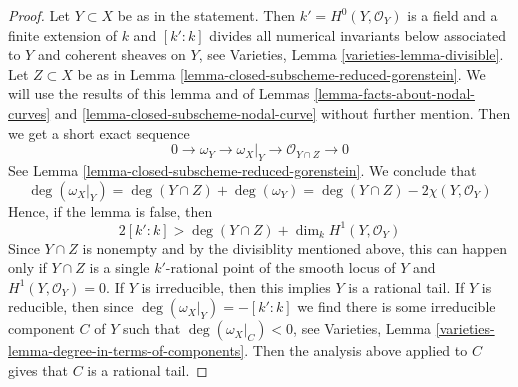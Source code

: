 \documentclass[10pt,a4paper]{amsart}
\theoremstyle{plain}
\theoremstyle{definition}
\theoremstyle{remark}
\numberwithin{equation}{subsection}
\begin{document}
\begin{proof}
Let $Y \subset X$ be as in the statement. Then $k' = H^0(Y, \mathcal{O}_Y)$
is a field and a finite extension of $k$ and $[k' : k]$
divides all numerical invariants below associated to $Y$ and
coherent sheaves on $Y$, see
Varieties, Lemma \ref{varieties-lemma-divisible}.
Let $Z \subset X$ be as in
Lemma \ref{lemma-closed-subscheme-reduced-gorenstein}.
We will use the results of this lemma and of
Lemmas \ref{lemma-facts-about-nodal-curves} and
\ref{lemma-closed-subscheme-nodal-curve} without further mention.
Then we get a short exact sequence
$$
0 \to \omega_Y \to \omega_X|_Y \to \mathcal{O}_{Y \cap Z} \to 0
$$
See Lemma \ref{lemma-closed-subscheme-reduced-gorenstein}.
We conclude that
$$
\deg(\omega_X|_Y) = \deg(Y \cap Z) + \deg(\omega_Y) =
\deg(Y \cap Z) - 2\chi(Y, \mathcal{O}_Y)
$$
Hence, if the lemma is false, then
$$
2[k' : k] > \deg(Y \cap Z) + \dim_k H^1(Y, \mathcal{O}_Y)
$$
Since $Y \cap Z$ is nonempty and by the divisiblity mentioned above,
this can happen only if $Y \cap Z$ is a single $k'$-rational point
of the smooth locus of $Y$ and $H^1(Y, \mathcal{O}_Y) = 0$.
If $Y$ is irreducible, then this implies $Y$ is a rational tail.
If $Y$ is reducible, then since $\deg(\omega_X|_Y) = -[k' : k]$
we find there is some irreducible component $C$ of $Y$
such that $\deg(\omega_X|_C) < 0$, see
Varieties, Lemma \ref{varieties-lemma-degree-in-terms-of-components}.
Then the analysis above applied
to $C$ gives that $C$ is a rational tail.
\end{proof}
\end{document}
